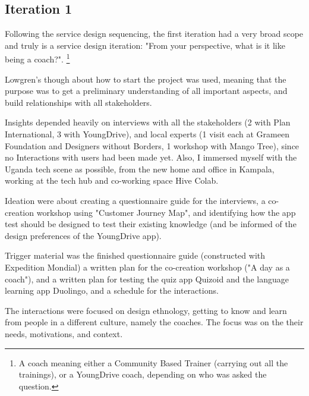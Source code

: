 \subsection{Iteration 1}


Following the service design sequencing, the first iteration had a very broad scope and truly is a service design iteration: "From your perspective, what is it like being a coach?". \footnote{A coach meaning either a Community Based Trainer (carrying out all the trainings), or a YoungDrive coach, depending on who was asked the question.}

Lowgren's though about how to start the project was used, meaning that the purpose was to get a preliminary understanding of all important aspects, and build relationships with all stakeholders.


Insights depended heavily on interviews with all the stakeholders  (2 with Plan International, 3 with YoungDrive), and local experts (1 visit each at Grameen Foundation and Designers without Borders, 1 workshop with Mango Tree), since no Interactions with users had been made yet. Also, I immersed myself with the Uganda tech scene as possible, from the new home and office in Kampala, working at the tech hub and co-working space Hive Colab.

Ideation were about creating a questionnaire guide for the interviews, a co-creation workshop using "Customer Journey Map", and identifying how the app test should be designed to test their existing knowledge (and be informed of the design preferences of the YoungDrive app).

Trigger material was the finished questionnaire guide (constructed with Expedition Mondial) a written plan for the co-creation workshop ("A day as a coach"), and a written plan for testing the quiz app Quizoid and the language learning app Duolingo, and a schedule for the interactions.

The interactions were focused on design ethnology, getting to know and learn from people in a different culture, namely the coaches. The focus was on the their needs, motivations, and context.

